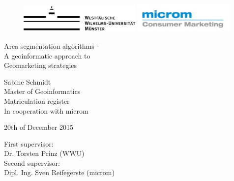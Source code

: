 
\thispagestyle{empty}

	
		\begin{center}
			
						\begin{figure}[htbp]
						\begin{minipage}[b][1cm]{0.6\textwidth}
						\includegraphics[width=6cm]{images/WWU_Logo1_1c}
						\end{minipage}
						\hfill
						\begin{minipage}[b][1cm]{0.3\textwidth}
						\includegraphics[width=5cm]{images/microm.jpg}
						\end{minipage}
						\end{figure}
			
				\par
				\vspace*{14ex}
		\Huge
					Area segmentation algorithms - \\
					A geoinformatic approach to \\
					Geomarketing strategies\\
				\par
		\normalsize
		\large
					 
			
				\vspace*{15ex}
					Sabine Schmidt\\
					Master of Geoinformatics\\
					Matriculation register\\
					In cooperation with microm
					
					20th of December 2015
				\par
			\end{center}
			
			\vspace*{25ex}
			First supervisor:\\
			Dr. Torsten Prinz (WWU)\\
			Second supervisor:\\
			Dipl. Ing. Sven Reifegerste (microm)